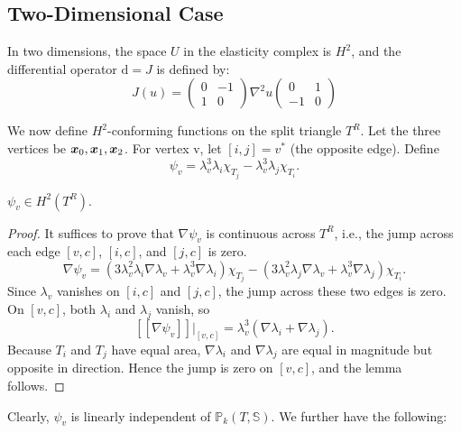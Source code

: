 \documentclass[letterpaper,12pt]{article}
\begin{document}
\subsection{Two-Dimensional Case}

In two dimensions, the space $U$ in the elasticity complex is $H^2$, and the differential operator $\mathrm{d} = J$ is defined by:
\begin{equation}
\label{eq:Jdef}
J(u) = 
\begin{pmatrix}
  0 & -1\\ 1 & 0
\end{pmatrix}
\nabla^2 u 
\begin{pmatrix}
  0 & 1\\ -1 & 0
\end{pmatrix}
\end{equation}

We now define $H^2$-conforming functions on the split triangle $T^R$. Let the three vertices be $\boldsymbol{x}_0, \boldsymbol{x}_1, \boldsymbol{x}_2$. For vertex \textsf{v}, let $[i, j] = v^*$ (the opposite edge). Define
$$
\psi_{v} = \lambda_v^3 \lambda_i \chi_{T_j} - \lambda_v^3 \lambda_j \chi_{T_i}.
$$

\begin{lemma}
$\psi_v \in H^2(T^R)$.
\end{lemma}
\begin{proof}
It suffices to prove that $\nabla\psi_v$ is continuous across $T^R$, i.e., the jump across each edge $[v, c]$, $[i, c]$, and $[j, c]$ is zero.
\[
\nabla \psi_v = 
(3\lambda_v^2\lambda_i \nabla \lambda_v + \lambda_v^3 \nabla \lambda_i)
\chi_{T_j} -
(3\lambda_v^2\lambda_j \nabla \lambda_v + \lambda_v^3 \nabla \lambda_j)
\chi_{T_i}.
\]
Since $\lambda_v$ vanishes on $[i, c]$ and $[j, c]$, the jump across these two edges is zero. On $[v, c]$, both $\lambda_i$ and $\lambda_j$ vanish, so
\[
[\![\nabla \psi_v]\!]|_{[v, c]} = \lambda_v^3 (\nabla \lambda_i + \nabla \lambda_j).
\]
Because $T_i$ and $T_j$ have equal area, $\nabla \lambda_i$ and $\nabla \lambda_j$ are equal in magnitude but opposite in direction. Hence the jump is zero on $[v, c]$, and the lemma follows.
\end{proof}

Clearly, $\psi_v$ is linearly independent of $\mathbb{P}_k(T, \mathbb{S})$. We further have the following:
\end{document}
